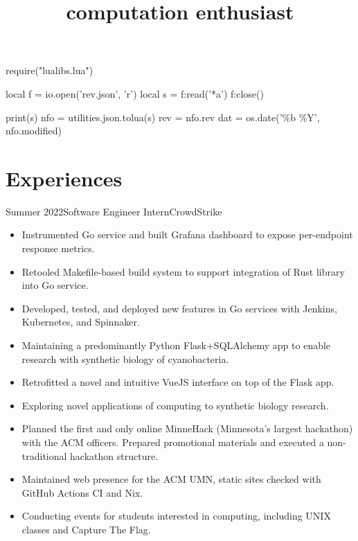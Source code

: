 \documentclass{moderncv}
\title{computation enthusiast}
\begin{document}
\begin{luacode}
require("lualibs.lua")

local f = io.open('rev.json', 'r')
local s = f:read('*a')
f:close()

print(s)
nfo = utilities.json.tolua(s)
rev = nfo.rev
dat = os.date('\%b \%Y', nfo.modified)
\end{luacode}

\newcommand{\githash}
{
  \href{https://github.com/tnytown/website/blob/\luadirect{tex.sprint(rev)}/cv.tex}
  {\texttt{\luadirect{tex.sprint(rev)}}}}
\newcommand{\lastmodified}{\luadirect{tex.sprint(dat)}}

\makecvtitle{}
\vspace*{-15mm} %

\section{Experiences}
\cventry
    {Summer 2022}{Software Engineer Intern}{CrowdStrike}{}{}
    {
      \begin{itemize}[label=\rightarrow,noitemsep]
      \item Instrumented Go service and built Grafana dashboard to expose per-endpoint response metrics.
      \item Retooled Makefile-based build system to support integration of Rust library into Go service.
      \item Developed, tested, and deployed new features in Go services with Jenkins, Kubernetes, and Spinnaker.
      \end{itemize}
    }

{
  \begin{itemize}[label=\rightarrow,noitemsep]
  \item Maintaining a predominantly Python Flask+SQLAlchemy app to enable research with synthetic biology of cyanobacteria.
  \item Retrofitted a novel and intuitive VueJS interface on top of the Flask app.
  \item Exploring novel applications of computing to synthetic biology research.
  \end{itemize}
}
  
{
  \begin{itemize}[label=\rightarrow,noitemsep]
  \item Planned the first and only online MinneHack (Minnesota's largest hackathon) with the ACM officers. Prepared promotional materials and executed a non-traditional hackathon structure.
  \item Maintained web presence for the ACM UMN, static sites checked with GitHub Actions CI and Nix.
  \item Conducting events for students interested in computing, including UNIX classes and Capture The Flag.
  \end{itemize}
}
\end{document}
